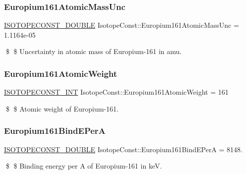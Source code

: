 \subsubsection{\texorpdfstring{Europium161\+Atomic\+Mass\+Unc}{Europium161AtomicMassUnc}}
{\footnotesize\ttfamily \mbox{\hyperlink{group___isotope_const-_macros_ga8f45a7272ce02c0b4c65c44636ed719a}{I\+S\+O\+T\+O\+P\+E\+C\+O\+N\+S\+T\+\_\+\+D\+O\+U\+B\+LE}} Isotope\+Const\+::\+Europium161\+Atomic\+Mass\+Unc = 1.\+1164e-\/05}

\$ \$ Uncertainty in atomic mass of Europium-\/161 in amu. \mbox{\label{group___isotope_const-_europium-_eu161_ga2c9a89b6d00e1fe6a93e5172e260bfa7}} 
\subsubsection{\texorpdfstring{Europium161\+Atomic\+Weight}{Europium161AtomicWeight}}
{\footnotesize\ttfamily \mbox{\hyperlink{group___isotope_const-_macros_ga5f18360b3e99483a35c32d789e62621c}{I\+S\+O\+T\+O\+P\+E\+C\+O\+N\+S\+T\+\_\+\+I\+NT}} Isotope\+Const\+::\+Europium161\+Atomic\+Weight = 161}

\$ \$ Atomic weight of Europium-\/161. \mbox{\label{group___isotope_const-_europium-_eu161_ga9eb8139779d7ec6be313cdae2b46c4c9}} 
\subsubsection{\texorpdfstring{Europium161\+Bind\+E\+PerA}{Europium161BindEPerA}}
{\footnotesize\ttfamily \mbox{\hyperlink{group___isotope_const-_macros_ga8f45a7272ce02c0b4c65c44636ed719a}{I\+S\+O\+T\+O\+P\+E\+C\+O\+N\+S\+T\+\_\+\+D\+O\+U\+B\+LE}} Isotope\+Const\+::\+Europium161\+Bind\+E\+PerA = 8148.}

\$ \$ Binding energy per A of Europium-\/161 in keV. \mbox{\label{group___isotope_const-_europium-_eu161_gabe1956ef06d95b07f8c745e7cac36c29}} 
